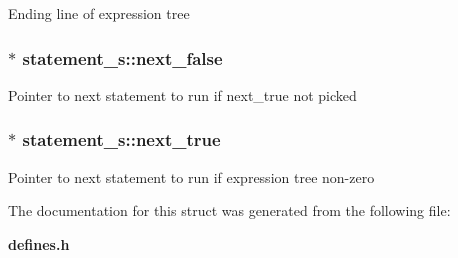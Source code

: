 Ending line of expression tree 
\subsubsection{$\ast$ statement\_\-s::next\_\-false}\label{structstatement__s_m4}


Pointer to next statement to run if next\_\-true not picked 
\subsubsection{$\ast$ statement\_\-s::next\_\-true}\label{structstatement__s_m3}


Pointer to next statement to run if expression tree non-zero 

The documentation for this struct was generated from the following file:\begin{CompactItemize}
\item 
{\bf defines.h}\end{CompactItemize}
